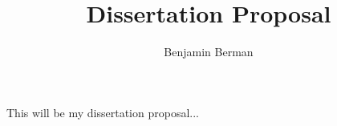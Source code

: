 \documentclass[11pt]{amsart}
\title{Dissertation Proposal}
\author{Benjamin Berman}
\begin{document}
\maketitle

This will be my dissertation proposal...



\end{document}
